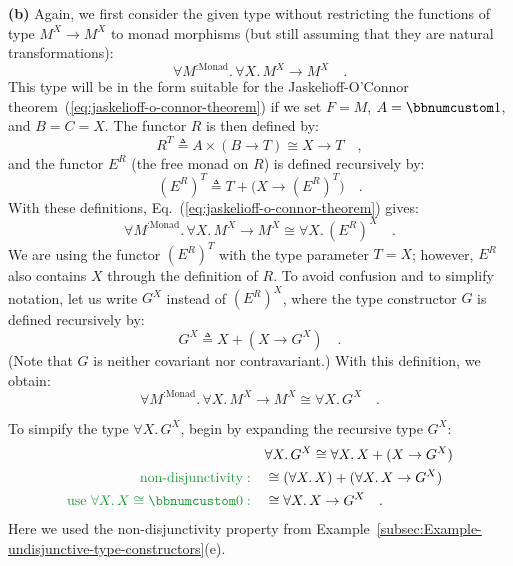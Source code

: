 \textbf{(b)} Again, we first consider the given type without restricting
the functions of type $M^{X}\rightarrow M^{X}$ to monad morphisms
(but still assuming that they are natural transformations):
\[
\forall M^{:\text{Monad}}.\,\forall X.\,M^{X}\rightarrow M^{X}\quad.
\]
This type will be in the form suitable for the Jaskelioff-O\textsf{'}Connor
theorem~(\ref{eq:jaskelioff-o-connor-theorem}) if we set $F=M$,
$A=\bbnum 1$, and $B=C=X$. The functor $R$ is then defined by:
\[
R^{T}\triangleq A\times(B\rightarrow T)\cong X\rightarrow T\quad,
\]
and the functor $E^{R}$ (the free monad on $R$) is defined recursively
by:
\[
(E^{R})^{T}\triangleq T+\big(X\rightarrow(E^{R})^{T}\big)\quad.
\]
 With these definitions, Eq.~(\ref{eq:jaskelioff-o-connor-theorem})
gives:
\[
\forall M^{:\text{Monad}}.\,\forall X.\,M^{X}\rightarrow M^{X}\cong\forall X.\,(E^{R})^{X}\quad.
\]
We are using the functor $(E^{R})^{T}$ with the type parameter $T=X$;
however, $E^{R}$ also contains $X$ through the definition of $R$.
To avoid confusion and to simplify notation, let us write $G^{X}$
instead of $(E^{R})^{X}$, where the type constructor $G$ is defined
recursively by:
\[
G^{X}\triangleq X+(X\rightarrow G^{X})\quad.
\]
(Note that $G$ is neither covariant nor contravariant.) With this
definition, we obtain:
\[
\forall M^{:\text{Monad}}.\,\forall X.\,M^{X}\rightarrow M^{X}\cong\forall X.\,G^{X}\quad.
\]

To simpify the type $\forall X.\,G^{X}$, begin by expanding the recursive
type $G^{X}$:
\begin{align*}
 & \forall X.\,G^{X}\cong\forall X.\,X+(X\rightarrow G^{X})\\
{\color{greenunder}\text{non-disjunctivity}:}\quad & \cong(\forall X.\,X)+(\forall X.\,X\rightarrow G^{X})\\
{\color{greenunder}\text{use }\forall X.\,X\cong\bbnum 0:}\quad & \cong\forall X.\,X\rightarrow G^{X}\quad.
\end{align*}
Here we used the non-disjunctivity property from Example~\ref{subsec:Example-undisjunctive-type-constructors}(e).

